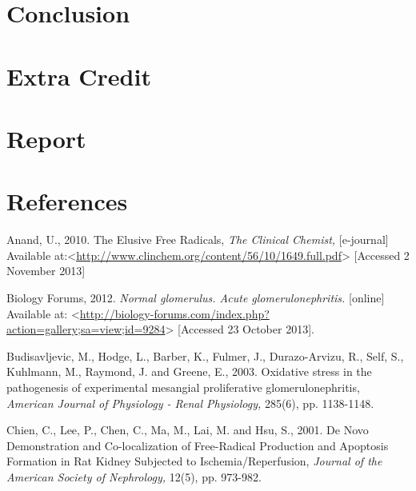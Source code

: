 \documentclass[11pt]{report}
\begin{document}
\section*{Conclusion}

\section*{Extra Credit}

\section*{Report}



\newpage
\section*{References}

Anand, U., 2010. The Elusive Free Radicals, \textit{The Clinical Chemist,} [e-journal] Available at:<\url{http://www.clinchem.org/content/56/10/1649.full.pdf}> [Accessed 2 November 2013]
\newline
\newline

Biology Forums, 2012. \textit{Normal glomerulus. Acute glomerulonephritis.} [online] Available at: <\url{http://biology-forums.com/index.php?action=gallery;sa=view;id=9284}> [Accessed 23 October 2013].
\newline
\newline

Budisavljevic, M., Hodge, L., Barber, K., Fulmer, J., Durazo-Arvizu, R., Self, S., Kuhlmann, M., Raymond, J. and Greene, E., 2003. Oxidative stress in the pathogenesis of experimental mesangial proliferative glomerulonephritis, \textit{American Journal of Physiology - Renal Physiology,} 285(6), pp. 1138-1148.
\newline
\newline

Chien, C., Lee, P., Chen, C., Ma, M., Lai, M. and Hsu, S., 2001. De Novo Demonstration and Co-localization of Free-Radical Production and Apoptosis Formation in Rat Kidney Subjected to Ischemia/Reperfusion, \textit{Journal of the American Society of Nephrology,} 12(5), pp. 973-982.
\newline
\newline
\end{document}
